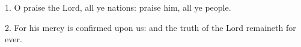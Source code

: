 1. O praise the Lord, all ye nations: praise him, all ye people.

2. For his mercy is confirmed upon us: and the truth of the Lord remaineth for ever. 